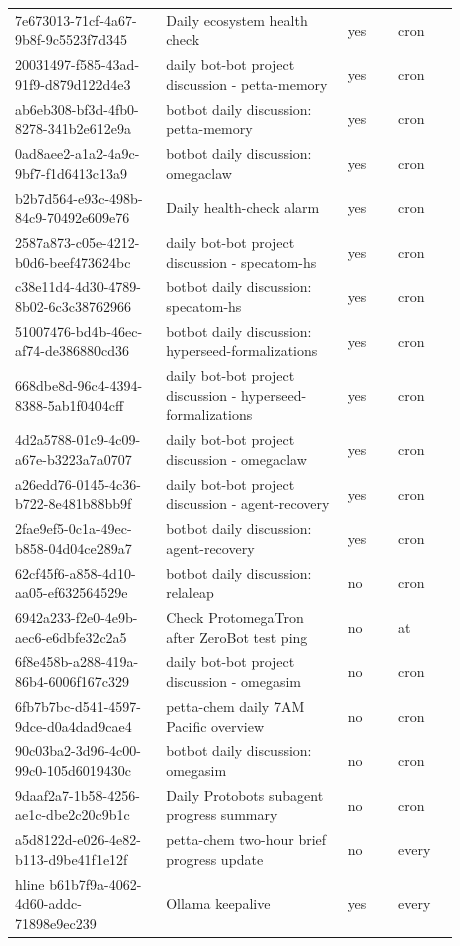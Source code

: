 \documentclass[11pt]{article}
\begin{document}
\begin{longtable}{p{0.30\linewidth}p{0.36\linewidth}p{0.10\linewidth}p{0.12\linewidth}}
7e673013-71cf-4a67-9b8f-9c5523f7d345 & Daily ecosystem health check & yes & cron \\
20031497-f585-43ad-91f9-d879d122d4e3 & daily bot-bot project discussion - petta-memory & yes & cron \\
ab6eb308-bf3d-4fb0-8278-341b2e612e9a & botbot daily discussion: petta-memory & yes & cron \\
0ad8aee2-a1a2-4a9c-9bf7-f1d6413c13a9 & botbot daily discussion: omegaclaw & yes & cron \\
b2b7d564-e93c-498b-84c9-70492e609e76 & Daily health-check alarm & yes & cron \\
2587a873-c05e-4212-b0d6-beef473624bc & daily bot-bot project discussion - specatom-hs & yes & cron \\
c38e11d4-4d30-4789-8b02-6c3c38762966 & botbot daily discussion: specatom-hs & yes & cron \\
51007476-bd4b-46ec-af74-de386880cd36 & botbot daily discussion: hyperseed-formalizations & yes & cron \\
668dbe8d-96c4-4394-8388-5ab1f0404cff & daily bot-bot project discussion - hyperseed-formalizations & yes & cron \\
4d2a5788-01c9-4c09-a67e-b3223a7a0707 & daily bot-bot project discussion - omegaclaw & yes & cron \\
a26edd76-0145-4c36-b722-8e481b88bb9f & daily bot-bot project discussion - agent-recovery & yes & cron \\
2fae9ef5-0c1a-49ec-b858-04d04ce289a7 & botbot daily discussion: agent-recovery & yes & cron \\
62cf45f6-a858-4d10-aa05-ef632564529e & botbot daily discussion: relaleap & no & cron \\
6942a233-f2e0-4e9b-aec6-e6dbfe32c2a5 & Check ProtomegaTron after ZeroBot test ping & no & at \\
6f8e458b-a288-419a-86b4-6006f167c329 & daily bot-bot project discussion - omegasim & no & cron \\
6fb7b7bc-d541-4597-9dce-d0a4dad9cae4 & petta-chem daily 7AM Pacific overview & no & cron \\
90c03ba2-3d96-4c00-99c0-105d6019430c & botbot daily discussion: omegasim & no & cron \\
9daaf2a7-1b58-4256-ae1c-dbe2c20c9b1c & Daily Protobots subagent progress summary & no & cron \\
a5d8122d-e026-4e82-b113-d9be41f1e12f & petta-chem two-hour brief progress update & no & every \\
hline
b61b7f9a-4062-4d60-addc-71898e9ec239 & Ollama keepalive & yes & every \\
\end{longtable}
\end{document}
